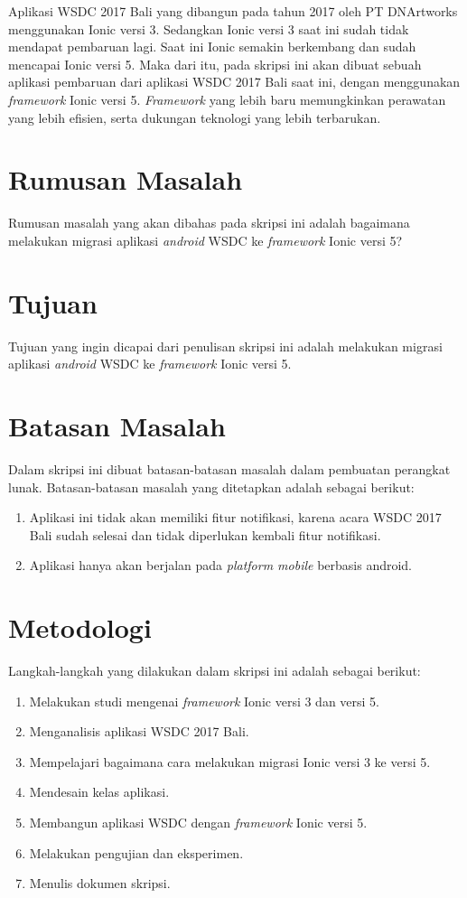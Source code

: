 Aplikasi WSDC 2017 Bali yang dibangun pada tahun 2017 oleh PT DNArtworks menggunakan Ionic versi 3. Sedangkan Ionic versi 3 saat ini sudah tidak mendapat pembaruan lagi. Saat ini Ionic semakin berkembang dan sudah mencapai Ionic versi 5. Maka dari itu, pada skripsi ini akan dibuat sebuah aplikasi pembaruan dari aplikasi WSDC 2017 Bali saat ini, dengan menggunakan \textit{framework} Ionic versi 5. \textit{Framework} yang lebih baru memungkinkan perawatan yang lebih efisien, serta dukungan teknologi yang lebih terbarukan.

\section{Rumusan Masalah}
\label{sec:rumusan}
Rumusan masalah yang akan dibahas pada skripsi ini adalah bagaimana melakukan migrasi aplikasi {\it android} WSDC ke {\it framework} Ionic versi 5?


\section{Tujuan}
\label{sec:tujuan}
Tujuan yang ingin dicapai dari penulisan skripsi ini adalah melakukan migrasi aplikasi {\it android} WSDC ke {\it framework} Ionic versi 5.

\section{Batasan Masalah}
\label{sec:batasan}
Dalam skripsi ini dibuat batasan-batasan masalah dalam pembuatan perangkat lunak.  Batasan-batasan masalah yang ditetapkan adalah sebagai berikut:

\begin{enumerate}
    \item Aplikasi ini tidak akan memiliki fitur notifikasi, karena acara WSDC 2017 Bali sudah selesai dan tidak diperlukan kembali fitur notifikasi.
    \item Aplikasi hanya akan berjalan pada \textit{platform mobile} berbasis android. 
\end{enumerate}


\section{Metodologi}
\label{sec:metlit}

Langkah-langkah yang dilakukan dalam skripsi ini adalah sebagai berikut:

\begin{enumerate}
	\item Melakukan studi mengenai {\it framework} Ionic versi 3 dan versi 5.
	\item Menganalisis aplikasi WSDC 2017 Bali.
	\item Mempelajari bagaimana cara melakukan migrasi Ionic versi 3 ke versi 5.
	\item Mendesain kelas aplikasi.
	\item Membangun aplikasi WSDC dengan {\it framework} Ionic versi 5. 
	\item Melakukan pengujian dan eksperimen.
	\item Menulis dokumen skripsi.
\end{enumerate}


